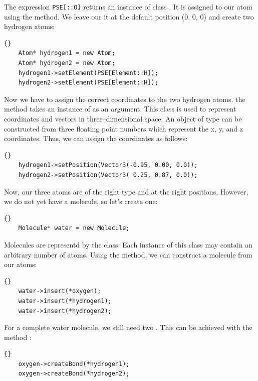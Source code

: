 \noindent
The expression {\tt PSE[::O]} returns an instance of class
. It is assigned to our atom using the 
method. We leave our it at the default position (0, 0, 0) and create two hydrogen atoms:

\begin{lstlisting}{}
	Atom* hydrogen1 = new Atom;
	Atom* hydrogen2 = new Atom;
	hydrogen1->setElement(PSE[Element::H]);
	hydrogen2->setElement(PSE[Element::H]);
\end{lstlisting}
	
\noindent
Now we have to assign the correct coordinates to the two hydrogen atoms.  the
method  takes an instance of  as an
argument. This class is used to represent coordinates and vectors in
three--dimensional space. An object of type  can be constructed
from three floating point numbers which represent the x, y, and z coordinates.
Thus, we can assign the coordinates as follows:
 
\begin{lstlisting}{}
 	hydrogen1->setPosition(Vector3(-0.95, 0.00, 0.0));
 	hydrogen2->setPosition(Vector3( 0.25, 0.87, 0.0));
\end{lstlisting}

\noindent

Now, our three atoms are of the right type and at the right positions. However, we
do not yet have a molecule, so let's create one:\\

\begin{lstlisting}{}
	Molecule* water = new Molecule;
\end{lstlisting}

\noindent
Molecules are representd by the  class. Each instance of this
class may contain an arbitrary number of atoms. Using the 
method, we can construct a molecule from our atoms:

\begin{lstlisting}{}
	water->insert(*oxygen);
	water->insert(*hydrogen1);
	water->insert(*hydrogen2);
\end{lstlisting}

\noindent
For a complete water molecule, we still need two . This can be
achieved with the method :
	
\begin{lstlisting}{}
	oxygen->createBond(*hydrogen1);
	oxygen->createBond(*hydrogen2);
\end{lstlisting}

